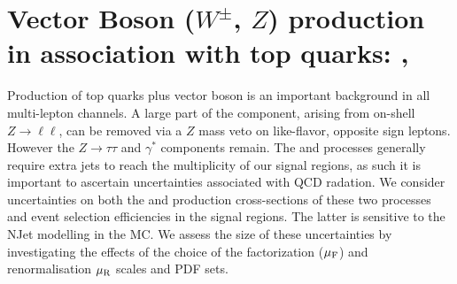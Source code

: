 

\section{Vector Boson ($W^{\pm}$, $Z$) production in association with top quarks: \ttV, \tZ}  
\label{section:ttV}
Production of top quarks plus vector boson is an important background in all multi-lepton channels.   A large part of the \ttV component, arising from on-shell $Z\to\ell\ell$, can be removed via a $Z$ mass veto on like-flavor, opposite sign leptons.  However the $Z \to \tau\tau$ and $\gamma^*$ components remain. The \ttW and \tZ processes generally require extra jets to reach the multiplicity of our signal regions, as such it is important to ascertain uncertainties associated with QCD radation. We consider uncertainties on both the \ttW and \ttZ production cross-sections of these two processes and event selection efficiencies in the signal regions. The latter is sensitive to the NJet modelling in the MC. We assess the size of these uncertainties by investigating the effects of the choice of the factorization ($\mu_{\rm F}$) and renormalisation $\mu_{\rm R}$ scales and PDF sets. 

